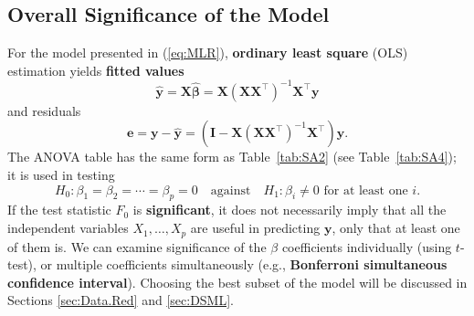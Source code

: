 \subsection{Overall Significance of the Model}
For the model presented in (\ref{eq:MLR}), \textbf{ordinary least square} (OLS) estimation yields \textbf{fitted values} $$\bm{\hat{y}}=\bm{X\hat{\beta}}=\bm{X}(\bm{XX}^{\!\top})^{-1}\bm{X}^{\!\top}\bm{y}$$ and residuals $$\bm{e}=\bm{y}-\bm{\hat{y}}=(\bm{I}-\bm{X}(\bm{XX}^{\!\top})^{-1}\bm{X}^{\!\top})\bm{y}.$$ The ANOVA table has the same form as Table~\ref{tab:SA2} (see Table~\ref{tab:SA4}); it is used in testing $$H_{0}: \beta_{1} = \beta_{2} = \cdots = \beta_{p}=0\quad\mbox{against}\quad H_{1}: \beta_{i} \neq 0 \text{ for at least one  } i.$$ If the test statistic $F_{0}$ is \textbf{significant}, it does not necessarily imply that all the independent variables $X_1, \ldots, X_p$ are useful in predicting $\mathbf{y}$, only that at least one of them is. We can examine significance of the $\beta$ coefficients individually (using $t$-test), or multiple coefficients simultaneously (e.g., \textbf{Bonferroni simultaneous confidence interval}). Choosing the best subset of the model will be discussed in Sections \ref{sec:Data.Red} and \ref{sec:DSML}.

